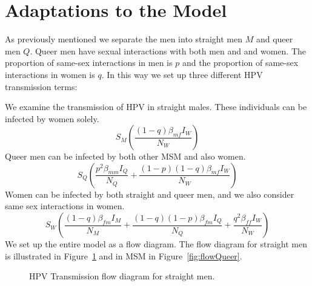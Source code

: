 \documentclass[12pt]{article}
\begin{document}
\section*{Adaptations to the Model}

As previously mentioned we separate the men into straight men $M$ and queer men $Q$.  Queer men have sexual interactions with both men and and women.  The proportion of same-sex interactions in men is $p$ and the proportion of same-sex interactions in women is $q$.  In this way we set up three different HPV transmission terms:

We examine the transmission of HPV in straight males.  These individuals can be infected by women solely.  
\begin{equation}
S_M\left(\frac{(1-q)\beta_{mf}I_W}{N_W}\right)
\end{equation}
Queer men can be infected by both other MSM and also women.
\begin{equation}
S_Q\left(\frac{p^2\beta_{mm}I_Q}{N_Q}+\frac{(1-p)(1-q)\beta_{mf}I_W}{N_W}\right)
\end{equation}
Women can be infected by both straight and queer men, and we also consider same sex interactions in women. 
\begin{equation}
S_W\left(\frac{(1-q)\beta_{fm}I_M}{N_M}+\frac{(1-q)(1-p)\beta_{fm}I_Q}{N_Q}+\frac{q^2\beta_{ff}I_W}{N_W}\right)
\end{equation}
We set up the entire model as a flow diagram.  The flow diagram for straight men is illustrated in Figure~\ref{fig:flowMen} and in MSM in Figure~\ref{fig:flowQueer}.  
\begin{figure}[h!]
\begin{center}
\end{center}
\caption{HPV Transmission flow diagram for straight men.}
\label{fig:flowMen}
\end{figure}
\end{document}

